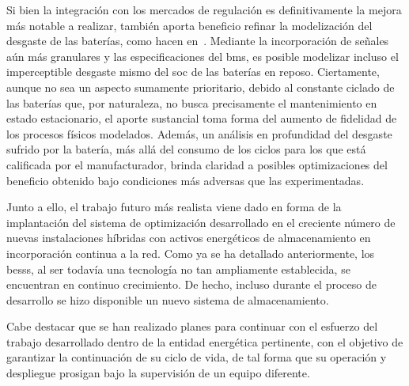 Si bien la integración con los mercados de regulación es definitivamente la mejora más notable a realizar, también aporta beneficio refinar la modelización del desgaste de las baterías, como hacen en~\cite{shamarova2022review}. Mediante la incorporación de señales aún más granulares y las especificaciones del \gls{bms}, es posible modelizar incluso el imperceptible desgaste mismo del \gls{soc} de las baterías en reposo. Ciertamente, aunque no sea un aspecto sumamente prioritario, debido al constante ciclado de las baterías que, por naturaleza, no busca precisamente el mantenimiento en estado estacionario, el aporte sustancial toma forma del aumento de fidelidad de los procesos físicos modelados. Además, un análisis en profundidad del desgaste sufrido por la batería, más allá del consumo de los ciclos para los que está calificada por el manufacturador, brinda claridad a posibles optimizaciones del beneficio obtenido bajo condiciones más adversas que las experimentadas.

Junto a ello, el trabajo futuro más realista viene dado en forma de la implantación del sistema de optimización desarrollado en el creciente número de nuevas instalaciones híbridas con activos energéticos de almacenamiento en incorporación continua a la red. Como ya se ha detallado anteriormente, los \glspl{bess}, al ser todavía una tecnología no tan ampliamente establecida, se encuentran en continuo crecimiento. De hecho, incluso durante el proceso de desarrollo se hizo disponible un nuevo sistema de almacenamiento.

Cabe destacar que se han realizado planes para continuar con el esfuerzo del trabajo desarrollado dentro de la entidad energética pertinente, con el objetivo de garantizar la continuación de su ciclo de vida, de tal forma que su operación y despliegue prosigan bajo la supervisión de un equipo diferente.
